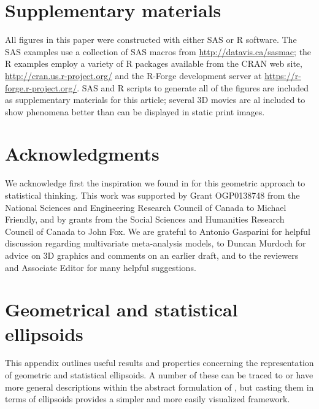\documentclass[11pt]{article}%
\begin{document}
\section{Supplementary materials}

All figures in this paper were constructed with either SAS or R software.
The SAS examples use a collection of SAS macros from \url{http://datavis.ca/sasmac}; the
R examples employ a variety of R packages available from the CRAN web site, \url{http://cran.us.r-project.org/}
and the R-Forge development server at \url{https://r-forge.r-project.org/}.
SAS and R scripts to generate all of the figures are included as supplementary materials for this article;
several 3D movies are al included to show phenomena better than can be displayed in static print images.


\section{Acknowledgments}

We acknowledge first the inspiration we found in \citet{Dempster:69} for this geometric approach to statistical thinking.
This work was supported by Grant OGP0138748 from the National Sciences and Engineering Research Council of Canada to Michael Friendly,
and by grants from the Social Sciences and Humanities Research Council of Canada to John Fox.
We are grateful to Antonio Gasparini for helpful discussion regarding multivariate meta-analysis models, to Duncan Murdoch for 
advice on 3D graphics and comments on an earlier draft, and to the reviewers and Associate Editor for many helpful suggestions.

{\itemsep -6pt
 \setlength{\bibsep}{2pt}

}



\appendix
{}
\section{Geometrical and statistical ellipsoids}
This appendix outlines useful results and properties concerning the representation of geometric and statistical ellipsoids.
A number of these can be traced to or have more general descriptions within the abstract formulation of \citet{Dempster:69},
but casting them in terms of ellipsoids provides a simpler and more easily visualized framework. 




\end{document}
